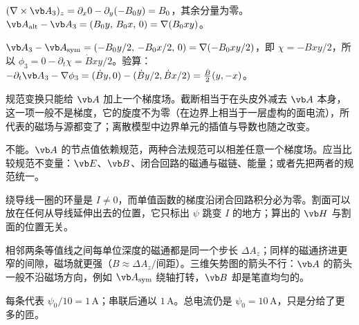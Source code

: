 \begin{answers}
\item $(\nabla\times\vb A_3)_z=\partial_x0-\partial_y(-B_0y)=B_0$，其余分量为零。$\vb A_{\rm alt}-\vb A_3=(B_0y,\,B_0x,\,0)=\nabla(B_0xy)$。
\item $\vb A_3-\vb A_{\rm sym}=(-B_0y/2,\,-B_0x/2,\,0)=\nabla(-B_0xy/2)$，即 $\chi=-Bxy/2$，所以 $\phi_3=0-\partial_t\chi=\dot Bxy/2$。验算：$-\partial_t\vb A_3-\nabla\phi_3=(\dot By,0)-(\dot By/2,\dot Bx/2)=\tfrac{\dot B}{2}(y,-x)$。
\item 规范变换只能给 $\vb A$ 加上一个梯度场。截断相当于在头皮外减去 $\vb A$ 本身，这一项一般不是梯度，它的旋度不为零（在边界上相当于一层虚构的面电流），所代表的磁场与源都变了；离散模型中边界单元的插值与导数也随之改变。
\item 不能。$\vb A$ 的节点值依赖规范，两种合法规范可以相差任意一个梯度场。应当比较规范不变量：$\vb E$、$\vb B$、闭合回路的磁通与磁链、能量；或者先把两者的规范统一。
\item 绕导线一圈的环量是 $I\neq0$，而单值函数的梯度沿闭合回路积分必为零。割面可以放在任何从导线延伸出去的位置，它只标出 $\psi$ 跳变 $I$ 的地方；算出的 $\vb H$ 与割面的位置无关。
\item 相邻两条等值线之间每单位深度的磁通都是同一个步长 $\Delta A_z$；同样的磁通挤进更窄的间隙，磁场就更强（$B\approx\Delta A_z/\text{间距}$）。三维矢势图的箭头不行：$\vb A$ 的箭头一般不沿磁场方向，例如 $\vb A_{\rm sym}$ 绕轴打转，$\vb B$ 却是笔直均匀的。
\item 每条代表 $\psi_0/10=1\,\mathrm A$；串联后通以 $1\,\mathrm A$。总电流仍是 $\psi_0=10\,\mathrm A$，只是分给了更多的匝。
\end{answers}
